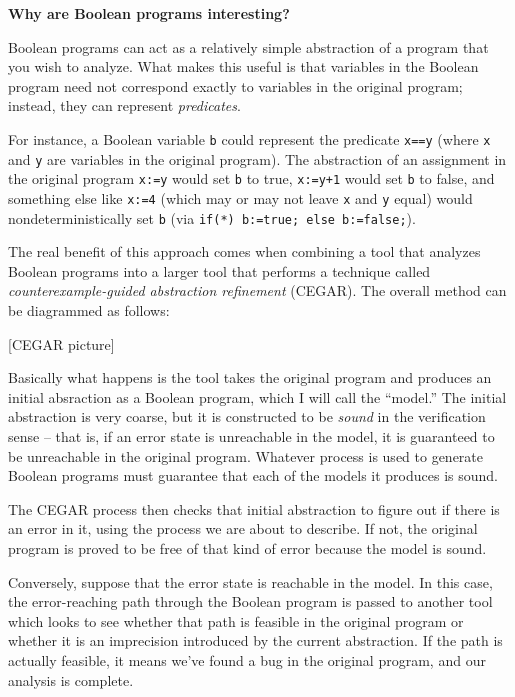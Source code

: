 \documentclass{article}
\newcommand{\Code}[1]{\texttt{#1}}
\newenvironment{sidebar}{}{}
\newcommand{\strong}[1]{\textbf{#1}}
\begin{document}
\begin{sidebar}
\strong{Why are Boolean programs interesting?}

Boolean programs can act as a relatively simple abstraction of a
program that you wish to analyze. What makes this useful is that
variables in the Boolean program need not correspond exactly to
variables in the original program; instead, they can represent
\emph{predicates}.

For instance, a Boolean variable \Code{b} could represent the
predicate \Code{x==y} (where \Code{x} and \Code{y} are variables in
the original program). The abstraction of an assignment in the
original program \Code{x:=y} would set \Code{b} to true, \Code{x:=y+1}
would set \Code{b} to false, and something else like \Code{x:=4}
(which may or may not leave \Code{x} and \Code{y} equal) would
nondeterministically set \Code{b} (via \Code{if(*) b:=true; else
  b:=false;}). 

The real benefit of this approach comes when combining a tool that
analyzes Boolean programs into a larger tool that performs a technique
called \emph{counterexample-guided abstraction refinement}
(CEGAR). The overall method can be diagrammed as follows:

[CEGAR picture]

Basically what happens is the tool takes the original program and
produces an initial absraction as a Boolean program, which I will call
the ``model.'' The initial abstraction is very coarse, but it is
constructed to be \emph{sound} in the verification sense -- that is,
if an error state is unreachable in the model, it is guaranteed to be
unreachable in the original program. Whatever process is used to
generate Boolean programs must guarantee that each of the models it
produces is sound.

The CEGAR process then checks that initial abstraction to figure out
if there is an error in it, using the process we are about to
describe. If not, the original program is proved to be free of that
kind of error because the model is sound.

Conversely, suppose that the error state is reachable in the model. In
this case, the error-reaching path through the Boolean program is
passed to another tool which looks to see whether that path is
feasible in the original program or whether it is an imprecision
introduced by the current abstraction. If the path is actually
feasible, it means we've found a bug in the original program, and our
analysis is complete.


\end{sidebar}
\end{document}
